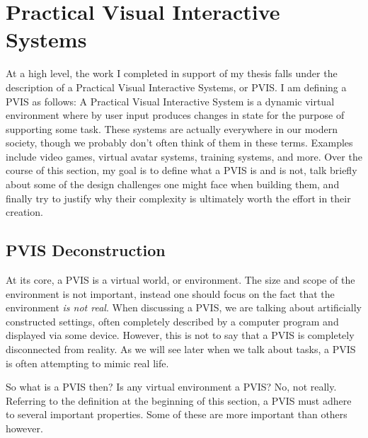 \documentclass[12pt,oneside,letterpaper]{memoir}
\begin{document}
\section{Practical Visual Interactive Systems}


At a high level, the work I completed in support of my thesis falls under the description
of a Practical Visual Interactive Systems, or PVIS. I am defining a
PVIS as follows: A Practical Visual Interactive System is a dynamic
virtual environment where by user input produces changes in state for
the purpose of supporting some task. These systems are actually
everywhere in our modern society, though we probably don't often think
of them in these terms. Examples include video games, virtual avatar
systems, training systems, and more. Over the course of this
section, my goal is to define what a PVIS is and is not, talk briefly
about some of the design challenges one might face when building them,
and finally try to justify why their complexity is ultimately worth
the effort in their creation.

\subsection{PVIS Deconstruction}

At its core, a PVIS is a virtual world, or environment. The size and
scope of the environment is not important, instead one should focus on
the fact that the environment \textit{is not real}. When discussing a PVIS, we
are talking about artificially constructed settings, often completely
described by a computer program and displayed via some
device. However, this is not to say that a PVIS is completely
disconnected from reality. As we will see later when we talk about
tasks, a PVIS is often attempting to mimic real life.

So what is a PVIS then? Is any virtual environment a PVIS? No, not
really. Referring to the definition at the beginning of this section,
a PVIS must adhere to several important properties. Some of these are
more important than others however. 
\end{document}
